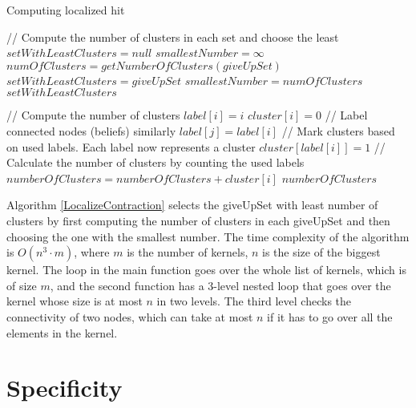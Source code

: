 \begin{algorithm}
\caption{Computing localized hit}
\label{LocalizeContraction}
\begin{algorithmic}[1]
\State // Compute the number of clusters in each set and choose the least
\State $setWithLeastClusters = null$
\State $smallestNumber = \infty$
\State $numOfClusters = getNumberOfClusters(giveUpSet)$
\State $setWithLeastClusters = giveUpSet$
\State $smallestNumber = numOfClusters$
\EndIf
\EndFor
\State \Return $setWithLeastClusters$
\EndFunction
\end{algorithmic}


\begin{algorithmic}[1]
\State // Compute the number of clusters
\State $label[i]=i$
\EndFor
{}
\State $cluster[i]=0$
\EndFor
\State // Label connected nodes (beliefs) similarly
\State $label[j] = label[i]$
\EndIf
\EndFor
\EndFor
\State // Mark clusters based on used labels. Each label now represents a cluster
\State $cluster[label[i]]=1$
\EndFor
\State // Calculate the number of clusters by counting the used labels
\State $numberOfClusters = numberOfClusters + cluster[i]$
\EndFor 
\State \Return $numberOfClusters$
\EndFunction
\end{algorithmic}
\end{algorithm}

Algorithm \ref{LocalizeContraction} selects the giveUpSet with least number of clusters by first computing the number of clusters in each giveUpSet and then choosing the one with the smallest number. The time complexity of the algorithm is $O(n^3 \cdot m)$, where $m$ is the number of kernels, $n$ is the size of the biggest kernel. The loop in the main function goes over the whole list of kernels, which is of size $m$, and the second function has a 3-level nested loop that goes over the kernel whose size is at most $n$ in two levels. The third level checks the connectivity of two nodes, which can take at most $n$ if it has to go over all the elements in the kernel.

\section{Specificity}

